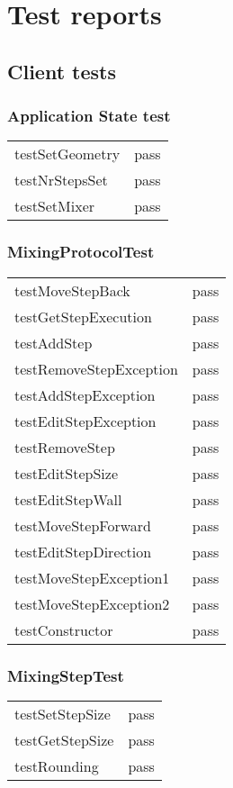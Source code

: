 \chapter{Test reports}\label{chap:testReports}


\section{Client tests}
\subsection*{Application State test}
\begin{tabular}{l|l}
testSetGeometry & pass \\
testNrStepsSet    & pass \\
testSetMixer        & pass \\
\end{tabular}

\subsection*{MixingProtocolTest}
\begin{tabular}{l|l}
testMoveStepBack             & pass \\
testGetStepExecution        & pass \\
testAddStep                       & pass \\
testRemoveStepException & pass \\
testAddStepException        & pass \\
testEditStepException        & pass \\
testRemoveStep                 & pass \\
testEditStepSize                 & pass \\
testEditStepWall                 & pass \\
testMoveStepForward        & pass \\
testEditStepDirection          & pass \\
testMoveStepException1   & pass \\
testMoveStepException2   & pass \\
testConstructor                  & pass \\
\end{tabular}

\subsection*{MixingStepTest}
\begin{tabular}{l|l}
testSetStepSize  & pass \\
testGetStepSize  & pass \\
testRounding      & pass \\
\end{tabular}

